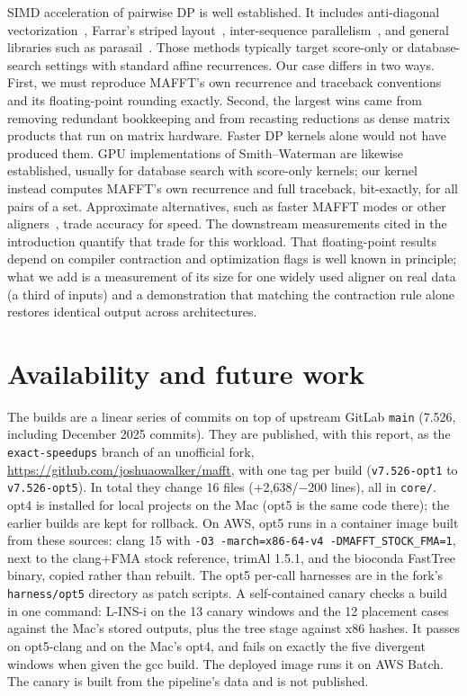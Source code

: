 \documentclass[11pt]{article}
\newcommand{\code}[1]{\texttt{#1}}
\begin{document}
SIMD acceleration of pairwise DP is well established. It includes anti-diagonal
vectorization~\cite{wozniak1997}, Farrar's striped layout~\cite{farrar2007}, inter-sequence
parallelism~\cite{rognes2011}, and general libraries such as parasail~\cite{daily2016}.
Those methods typically target score-only or database-search settings with standard
affine recurrences. Our case differs in two ways. First, we must reproduce MAFFT's own
recurrence and traceback conventions and its floating-point rounding exactly. Second, the
largest wins came from removing redundant bookkeeping and from recasting reductions as
dense matrix products that run on matrix hardware. Faster DP kernels alone would not have
produced them. GPU implementations of Smith--Waterman are likewise established, usually for database search
with score-only kernels; our kernel instead computes MAFFT's own recurrence and full
traceback, bit-exactly, for all pairs of a set. Approximate alternatives, such as faster MAFFT modes or other
aligners~\cite{vaser2017}, trade accuracy for speed. The downstream measurements cited
in the introduction quantify that trade for this workload. That floating-point results
depend on compiler contraction and optimization flags is well known in principle; what we
add is a measurement of its size for one widely used aligner on real data (a third of
inputs) and a demonstration that matching the contraction rule alone restores identical
output across architectures.

\section{Availability and future work}
\label{sec:avail}

The builds are a linear series of commits on top of upstream GitLab \code{main} (7.526,
including December 2025 commits). They are published, with this report, as the
\code{exact-speedups} branch of an unofficial fork,
\url{https://github.com/joshuaowalker/mafft}, with one tag per build
(\code{v7.526-opt1} to \code{v7.526-opt5}). In total they change 16 files
(+2{,}638/$-$200 lines), all in \code{core/}. opt4 is installed for local projects on the Mac (opt5 is the same
code there); the earlier builds are kept for rollback. On AWS, opt5 runs in a container image
built from these sources: clang 15 with \code{-O3 -march=x86-64-v4 -DMAFFT\_STOCK\_FMA=1}, next
to the clang+FMA stock reference, trimAl 1.5.1, and the bioconda FastTree binary, copied
rather than rebuilt. The opt5 per-call harnesses are in the fork's \code{harness/opt5}
directory as patch scripts. A self-contained
canary checks a build in one command: L-INS-i on the 13 canary windows and the 12 placement
cases against the Mac's stored outputs, plus the tree stage against x86 hashes. It passes on
opt5-clang and on the Mac's opt4, and fails on exactly the five divergent windows when given
the gcc build. The deployed image runs it on AWS Batch. The canary is built from the pipeline's data and is not published.
\end{document}
